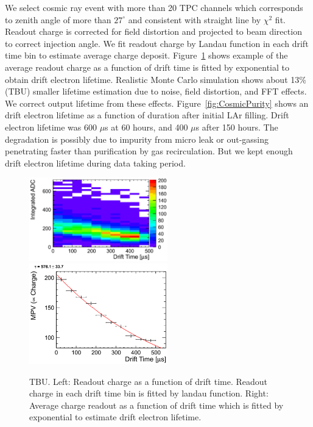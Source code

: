 We select cosmic ray event with more than 20 TPC channels which corresponds to zenith angle of more than $27^\circ$ and consistent with straight line by $\chi^2$ fit. 
Readout charge is corrected for field distortion and projected to beam direction to correct injection angle.
We fit readout charge by Landau function in each drift time bin to estimate average charge deposit. 
Figure~\ref{fig:tauExample} shows example of the average readout charge as a function of drift time is fitted by exponential to obtain drift electron lifetime. 
Realistic Monte Carlo simulation shows about 13\% (TBU) smaller lifetime estimation due to noise, field distortion, and FFT effects. 
We correct output lifetime from these effects.
Figure~\ref{fig:CosmicPurity} shows an drift electron lifetime as a function of duration after initial LAr filling.
Drift electron lifetime was 600 $\mu$s at 60 hours, and 400 $\mu$s after 150 hours.
The degradation is possibly due to impurity from micro leak or out-gassing penetrating faster than purification by gas recirculation.
But we kept enough drift electron lifetime during data taking period.

\begin{figure}[htbp]
 \begin{center}
  \includegraphics[width=60mm]{fig/chargeDep.eps}
  \includegraphics[width=60mm]{fig/tauExample.eps}
 \end{center}
 \caption{TBU. Left: Readout charge as a function of drift time. Readout charge in each drift time bin is fitted by landau function. Right: Average charge readout as a function of drift time which is fitted by exponential to estimate drift electron lifetime.}
 \label{fig:tauExample}
\end{figure}


